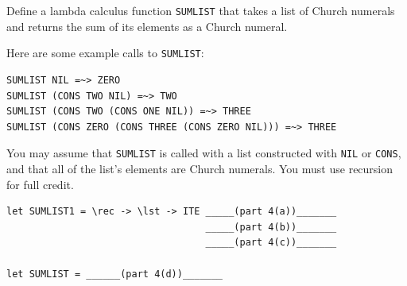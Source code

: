 \documentclass[addpoints]{exam}
\begin{document}
\begin{questions}
\newpage

\question Define a lambda calculus function \texttt{SUMLIST} that takes a list of Church numerals and returns the sum of its elements as a Church numeral.

Here are some example calls to \texttt{SUMLIST}:

\begin{verbatim}
SUMLIST NIL =~> ZERO
SUMLIST (CONS TWO NIL) =~> TWO
SUMLIST (CONS TWO (CONS ONE NIL)) =~> THREE
SUMLIST (CONS ZERO (CONS THREE (CONS ZERO NIL))) =~> THREE
\end{verbatim}

You may assume that \texttt{SUMLIST} is called with a list constructed with \texttt{NIL} or \texttt{CONS}, and that all of the list's elements are Church numerals.  You must use recursion for full credit.

\begin{verbatim}
let SUMLIST1 = \rec -> \lst -> ITE _____(part 4(a))_______
                                   _____(part 4(b))_______
                                   _____(part 4(c))_______
                      
let SUMLIST = ______(part 4(d))_______
\end{verbatim}

\end{questions}
\end{document}
